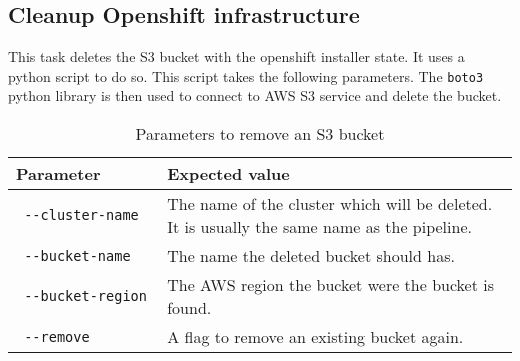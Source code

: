 \subsection{Cleanup Openshift infrastructure}\label{subsec:cleanup-openshift-infrastructure}

This task deletes the S3 bucket with the openshift installer state.
It uses a python script to do so.
This script takes the following parameters.
The \verb|boto3| python library is then used to connect to AWS S3 service and delete the bucket.

\begin{table}
    \centering
    \caption{Parameters to remove an S3 bucket}
    \label{tab:params-remove-s3-bucket}
    \begin{tabular}{|p{0.3\linewidth}|p{0.7\linewidth}|}
        Parameter & Expected value \\
        \hline
        \verb| --cluster-name | & The name of the cluster which will be deleted.
            It is usually the same name as the pipeline. \\
        \verb| --bucket-name | & The name the deleted bucket should has. \\
        \verb| --bucket-region | & The AWS region the bucket were the bucket is found. \\
        \verb| --remove | & A flag to remove an existing bucket again. \\
    \end{tabular}
\end{table}

